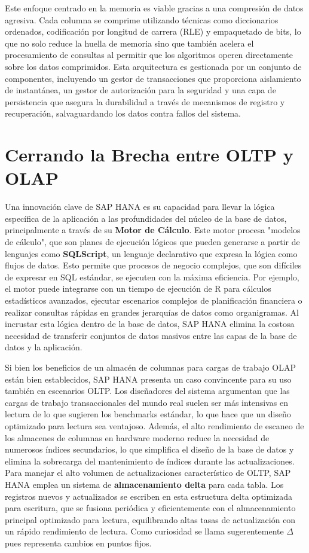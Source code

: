 \documentclass[12pt,a4paper]{article}
\begin{document}
Este enfoque centrado en la memoria es viable gracias a una compresión de datos agresiva. Cada columna se comprime utilizando técnicas como diccionarios ordenados, codificación por longitud de carrera (RLE) y empaquetado de bits, lo que no solo reduce la huella de memoria sino que también acelera el procesamiento de consultas al permitir que los algoritmos operen directamente sobre los datos comprimidos. Esta arquitectura es gestionada por un conjunto de componentes, incluyendo un gestor de transacciones que proporciona aislamiento de instantánea, un gestor de autorización para la seguridad y una capa de persistencia que asegura la durabilidad a través de mecanismos de registro y recuperación, salvaguardando los datos contra fallos del sistema.

\section*{Cerrando la Brecha entre OLTP y OLAP}

Una innovación clave de SAP HANA es su capacidad para llevar la lógica específica de la aplicación a las profundidades del núcleo de la base de datos, principalmente a través de su \textbf{Motor de Cálculo}. Este motor procesa "modelos de cálculo", que son planes de ejecución lógicos que pueden generarse a partir de lenguajes como \textbf{SQLScript}, un lenguaje declarativo que expresa la lógica como flujos de datos. Esto permite que procesos de negocio complejos, que son difíciles de expresar en SQL estándar, se ejecuten con la máxima eficiencia. Por ejemplo, el motor puede integrarse con un tiempo de ejecución de R para cálculos estadísticos avanzados, ejecutar escenarios complejos de planificación financiera o realizar consultas rápidas en grandes jerarquías de datos como organigramas. Al incrustar esta lógica dentro de la base de datos, SAP HANA elimina la costosa necesidad de transferir conjuntos de datos masivos entre las capas de la base de datos y la aplicación.

Si bien los beneficios de un almacén de columnas para cargas de trabajo OLAP están bien establecidos, SAP HANA presenta un caso convincente para su uso también en escenarios OLTP. Los diseñadores del sistema argumentan que las cargas de trabajo transaccionales del mundo real suelen ser más intensivas en lectura de lo que sugieren los benchmarks estándar, lo que hace que un diseño optimizado para lectura sea ventajoso. Además, el alto rendimiento de escaneo de los almacenes de columnas en hardware moderno reduce la necesidad de numerosos índices secundarios, lo que simplifica el diseño de la base de datos y elimina la sobrecarga del mantenimiento de índices durante las actualizaciones. Para manejar el alto volumen de actualizaciones característico de OLTP, SAP HANA emplea un sistema de \textbf{almacenamiento delta} para cada tabla. Los registros nuevos y actualizados se escriben en esta estructura delta optimizada para escritura, que se fusiona periódica y eficientemente con el almacenamiento principal optimizado para lectura, equilibrando altas tasas de actualización con un rápido rendimiento de lectura. Como curiosidad se llama sugerentemente $\Delta$ pues representa cambios en puntos fijos.
\end{document}
